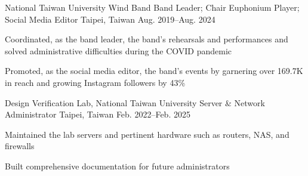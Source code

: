 

\begin{cventries}
    \cventry
        {National Taiwan University Wind Band} %
        {Band Leader; Chair Euphonium Player; Social Media Editor} %
        {Taipei, Taiwan} %
        {Aug. 2019--Aug. 2024} %
        {
          \begin{cvitems} %
            \item Coordinated, as the band leader, the band's rehearsals and performances and solved administrative difficulties during the COVID pandemic
            \item Promoted, as the social media editor, the band's events by garnering over 169.7K in reach and growing Instagram followers by 43\%
          \end{cvitems}
        }
        
    \cventry
        {Design Verification Lab, National Taiwan University} %
        {Server \& Network Administrator} %
        {Taipei, Taiwan} %
        {Feb. 2022--Feb. 2025} %
        {
          \begin{cvitems} %
            \item Maintained the lab servers and pertinent hardware such as routers, NAS, and firewalls
            \item Built comprehensive documentation for future administrators
          \end{cvitems}
        }

\end{cventries}